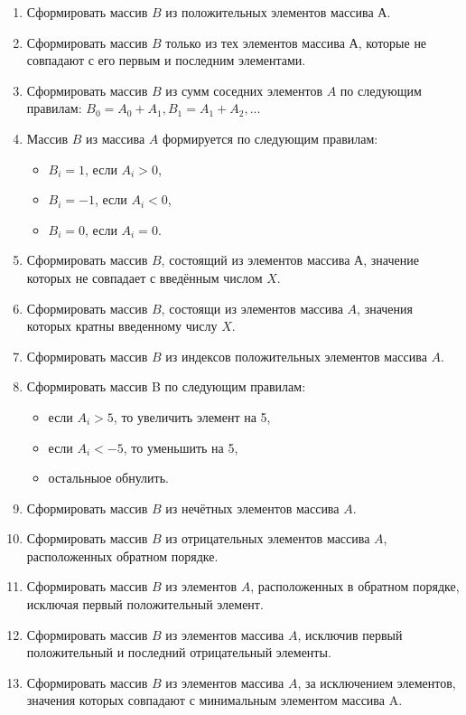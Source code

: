 \documentclass[a4paper, 12pt, oneside]{article}
\begin{document}
\begin{enumerate}
    \item Сформировать массив $B$ из положительных элементов массива $А$.
    \item Сформировать массив $B$ только из тех элементов массива $А$, которые не совпадают с его первым и последним элементами.
    \item Сформировать массив $B$ из сумм соседних элементов $A$ по следующим правилам: $B_0 =A_0 +A_1, B_1 = A_1 + A_2, ...$
    \item Массив $B$ из массива $A$ формируется по следующим правилам:
    \begin{itemize}
        \item $B_i =  1$, если $A_i > 0$,
        \item $B_i = -1$, если $A_i < 0$,
        \item $B_i =  0$, если $A_i = 0$.
    \end{itemize}
    \item Сформировать массив $B$, состоящий из элементов массива $А$, значение которых не совпадает с введённым числом $X$.
    \item Сформировать массив $B$, состоящи из элементов массива $A$, значения которых кратны введенному числу $X$.
    \item Сформировать массив $B$ из индексов положительных элементов массива $A$.
    \item Сформировать массив B по следующим правилам:
    \begin{itemize}
        \item если $A_i > 5$, то увеличить элемент на 5,
        \item если $A_i < -5$, то уменьшить на 5,
        \item остальныое обнулить.
    \end{itemize}
    \item Сформировать массив $B$ из нечётных элементов массива $A$.
    \item Сформировать массив $B$ из отрицательных элементов массива $A$, расположенных обратном порядке.
    \item Сформировать массив $B$ из элементов $A$, расположенных в обратном порядке, исключая первый положительный элемент.
    \item Сформировать массив $B$ из элементов массива $A$, исключив первый положительный и последний отрицательный элементы.
    \item Сформировать массив $B$ из элементов массива $A$, за исключением элементов, значения которых совпадают с минимальным элементом массива A.

\end{enumerate}
\end{document}

